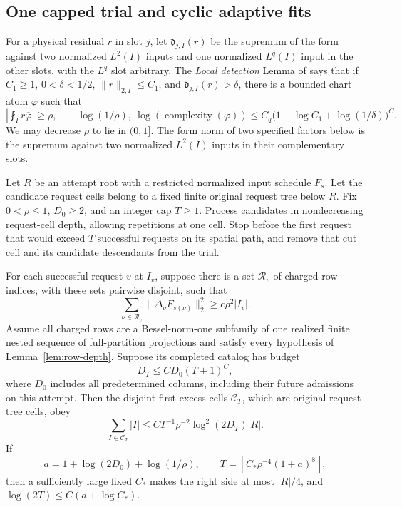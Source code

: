 \subsection{One capped trial and cyclic adaptive fits}

For a physical residual \(r\) in slot \(j\), let
\(\mathfrak d_{j,I}(r)\) be the supremum of the form against two
normalized \(L^2(I)\) inputs and one normalized \(L^q(I)\) input in
the other slots, with the \(L^q\) slot arbitrary.  The
\emph{Local detection} Lemma of \cite[Section~4]{H} says that if
\(C_1\ge1\), \(0<\delta<1/2\), \(\|r\|_{2,I}\le C_1\), and
\(\mathfrak d_{j,I}(r)>\delta\), there is a bounded chart atom
\(\varphi\) such that
\[
 \left|\fint_I r\overline\varphi\right|\ge\rho,\qquad
 \log(1/\rho),\ \log(\operatorname{complexity}(\varphi))
 \le C_q\bigl(1+\log C_1+\log(1/\delta)\bigr)^C.
\]
We may decrease \(\rho\) to lie in \((0,1]\).  The form norm of two
specified factors below is the supremum against two normalized
\(L^2(I)\) inputs in their complementary slots.

\begin{lemma}
\label{lem:hbase-trial}
Let \(R\) be an attempt root with a restricted normalized input
schedule \(F_s\).  Let the candidate request cells belong to a fixed finite
original request tree below \(R\).  Fix
\(0<\rho\le1\), \(D_0\ge2\), and an integer cap \(T\ge1\).
Process candidates in nondecreasing request-cell depth, allowing
repetitions at one cell.  Stop before the first request that would
exceed \(T\) successful requests on its spatial path, and remove
that cut cell and its candidate descendants from the trial.

For each successful request \(v\) at \(I_v\), suppose there is a
set \(\mathcal R_v\) of charged row indices, with these sets pairwise
disjoint, such that
\[
 \sum_{\nu\in\mathcal R_v}
       \|\Delta_\nu F_{s(\nu)}\|_2^2
 \ge c\rho^2|I_v|.
\]
Assume all charged rows are a Bessel-norm-one subfamily of one
realized finite nested sequence of full-partition projections and
satisfy every hypothesis of Lemma~\ref{lem:row-depth}.  Suppose its
completed catalog has budget
\[
 D_T\le C D_0(T+1)^C,
\]
where \(D_0\) includes all predetermined columns, including their
future admissions on this attempt.  Then the disjoint first-excess
cells \(\mathcal C_T\), which are original request-tree cells, obey
\begin{equation}
 \sum_{I\in\mathcal C_T}|I|
 \le C T^{-1}\rho^{-2}\log^2(2D_T)|R|.                        \label{eq:hbase-trial-cut}
\end{equation}
If
\[
 a=1+\log(2D_0)+\log(1/\rho),\qquad
 T=\left\lceil C_*\rho^{-4}(1+a)^8\right\rceil,
\]
then a sufficiently large fixed \(C_*\) makes the right side at
most \(|R|/4\), and \(\log(2T)\le C(a+\log C_*)\).
\end{lemma}

